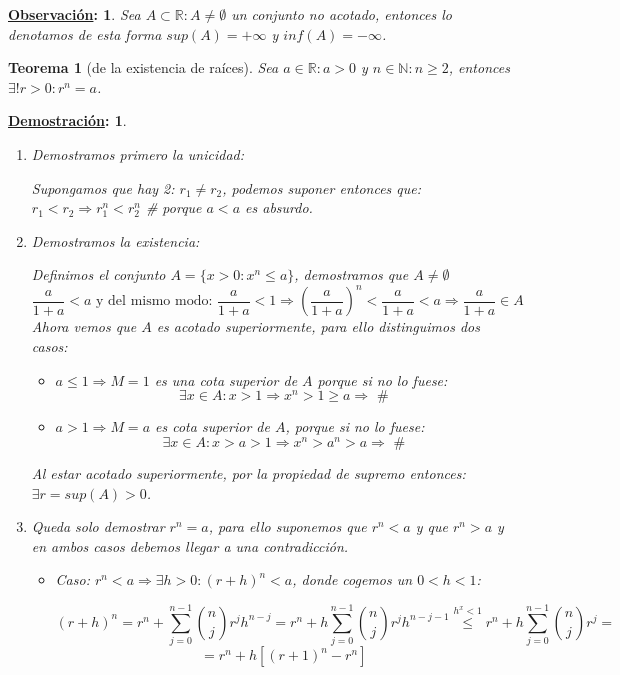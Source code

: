 \documentclass[10pt,a4paper,openright]{book}
\theoremstyle{break}
\newtheorem*{theo}{Teorema}
\newtheorem*{demo}{\underline{Demostración}:}
\newtheorem*{obs}{\underline{Observación}:}
\begin{document}
\begin{obs}
Sea $A\subset \mathbb R: A\neq \emptyset$ un conjunto no acotado, entonces lo denotamos de esta forma $sup(A)=+\infty$ y $inf(A)=-\infty$.
\end{obs}

\begin{theo}[de la existencia de raíces]
Sea $a\in \mathbb R: a>0$ y $n\in \mathbb N: n\geq 2$, entonces $\exists! r>0: r^n=a$.
\end{theo}
\begin{demo}
\begin{enumerate}
\item Demostramos primero la unicidad:\par
Supongamos que hay 2: $r_1\neq r_2$, podemos suponer entonces que: $r_1<r_2\Rightarrow r_1^n<r_2^n$ \# porque $a<a$ es absurdo.

\item Demostramos la existencia:\par 
Definimos el conjunto $A=\{x>0: x^n\leq a\}$, demostramos que $A\neq \emptyset$
$$\frac{a}{1+a}<a\mbox{ y del mismo modo: }\frac{a}{1+a}<1\Rightarrow \left(\frac{a}{1+a}\right)^n<\frac{a}{1+a}<a\Rightarrow \frac{a}{1+a}\in A$$
Ahora vemos que $A$ es acotado superiormente, para ello distinguimos dos casos:
	\begin{itemize}
	\item $a\leq 1\Rightarrow M=1$ es una cota superior de $A$ porque si no lo fuese:
$$\exists x\in A: x>1\Rightarrow x^n>1\geq a\Rightarrow \mbox{ \#}$$

	\item  $a>1\Rightarrow M=a$ es cota superior de $A$, porque si no lo fuese:
$$\exists x\in A: x>a>1 \Rightarrow x^n>a^n>a\Rightarrow\mbox{ \#}$$
	\end{itemize}

Al estar acotado superiormente, por la propiedad de supremo entonces: $\exists r=sup(A)>0$.
\item Queda solo demostrar $r^n=a$, para ello suponemos que $r^n<a$ y que $r^n>a$ y en ambos casos debemos llegar a una contradicción.
	\begin{itemize}
	\item Caso: $r^n<a\Rightarrow \exists h>0: (r+h)^n<a$, donde cogemos un $0<h<1$:
	
$$(r+h)^n=r^n+\sum_{j=0}^{n-1}\binom{n}{j}r^jh^{n-j}=r^n+h\sum_{j=0}^{n-1}\binom{n}{j}r^jh^{n-j-1}\stackrel{h^x<1}{\leq}r^n+h\sum_{j=0}^{n-1}\binom{n}{j}r^j=$$
$$=r^n+h\left[(r+1)^n-r^n\right]$$


\end{itemize}
\end{enumerate}
\end{demo}
\end{document}
